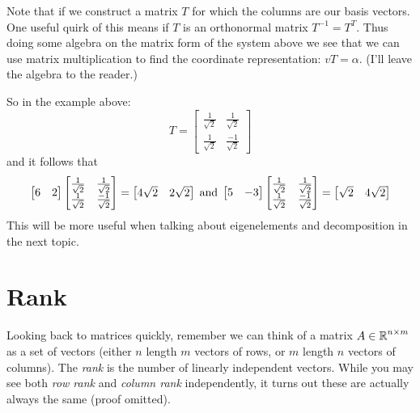 \begin{aside}
Note that if we construct a matrix $T$ for which the columns are our basis vectors.
One useful quirk of this means if $T$ is an orthonormal matrix $T^{-1} = T^T$. 
Thus doing some algebra on the matrix form of the system above we see that 
we can use matrix multiplication to find the coordinate representation: $vT=\alpha$.
(I'll leave the algebra to the reader.)
\vspace{2em}

So in the example above: 
\[T=\begin{bmatrix}\frac{1}{\sqrt{2}} & \frac{1}{\sqrt{2}} \\\frac{1}{\sqrt{2}} & \frac{-1}{\sqrt{2}}\end{bmatrix}\]
and it follows that 
\[
\begin{bmatrix}6 & 2\end{bmatrix}\begin{bmatrix}\frac{1}{\sqrt{2}} & \frac{1}{\sqrt{2}} \\\frac{1}{\sqrt{2}} & \frac{-1}{\sqrt{2}}\end{bmatrix} = \begin{bmatrix}4\sqrt{2} & 2\sqrt{2}\end{bmatrix}
\;\textnormal{and}\;
\begin{bmatrix}5 & -3\end{bmatrix}\begin{bmatrix}\frac{1}{\sqrt{2}} & \frac{1}{\sqrt{2}} \\\frac{1}{\sqrt{2}} & \frac{-1}{\sqrt{2}}\end{bmatrix} = \begin{bmatrix}\sqrt{2} & 4\sqrt{2}\end{bmatrix}
\]
This will be more useful when talking about eigenelements and decomposition in the next topic. 
\end{aside}

\section{Rank}
Looking back to matrices quickly,
remember we can think of a matrix $A\in\operatorname{\mathbb{R}}^{n\times m}$ as a set of vectors (either $n$ length $m$ vectors of rows, or $m$ length $n$ vectors of columns). 
The \emph{rank} is the number of linearly independent vectors. 
While you may see both \textit{row rank} and \textit{column rank} independently, 
it turns out these are actually always the same (proof omitted). 

